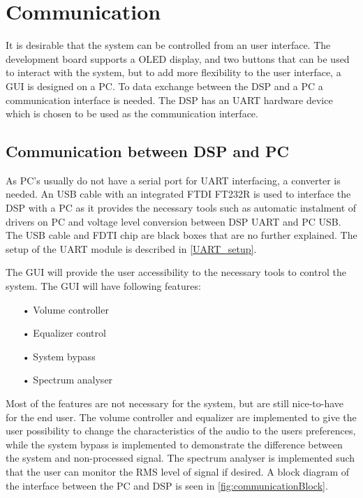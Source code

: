 \chapter{Communication}

It is desirable that the system can be controlled from an user interface. The development board supports a OLED display, and two buttons that can be used to interact with the system, but to add more flexibility to the user interface, a GUI is designed on a PC. To data exchange between the DSP and a PC a communication interface is needed. The DSP has an UART hardware device which is chosen to be used as the communication interface. 

\section{Communication between DSP and PC}

As PC's usually do not have a serial port for UART interfacing, a converter is needed. An USB cable with an integrated FTDI FT232R is used to interface the DSP with a PC as it provides the necessary tools such as automatic instalment of drivers on PC and voltage level conversion between DSP UART and PC USB. The USB cable and FDTI chip are black boxes that are no further explained. The setup of the UART module is described in \autoref{UART_setup}.

The GUI will provide the user accessibility to the necessary tools to control the system. The GUI will have following features:
\begin{itemize}
\item[•]Volume controller
\item[•]Equalizer control
\item[•]System bypass
\item[•]Spectrum analyser
\end{itemize} 

Most of the features are not necessary for the system, but are still nice-to-have for the end user. The volume controller and equalizer are implemented to give the user possibility to change the characteristics of the audio to the users preferences, while the system bypass is implemented to demonstrate the difference between the system and non-processed signal. The spectrum analyser is implemented such that the user can monitor the RMS level of signal if desired. A block diagram of the interface between the PC and DSP is seen in \autoref{fig:communicationBlock}.

